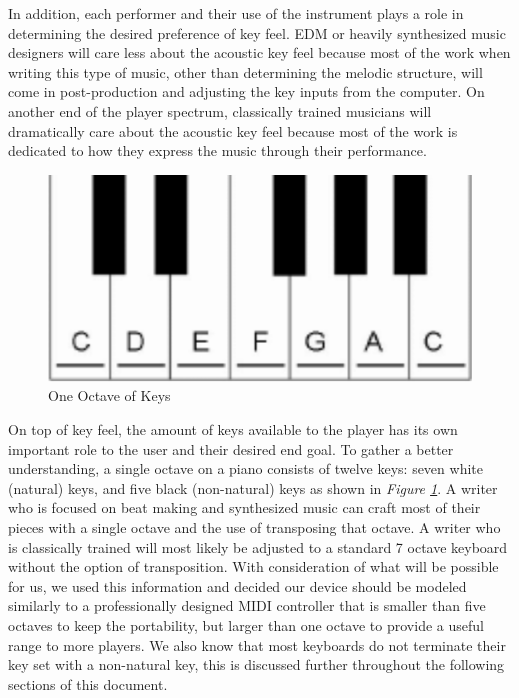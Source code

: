 In addition, each performer and their use of the instrument plays a role in determining the desired preference of key feel. EDM or heavily synthesized music designers will care less about the acoustic key feel because most of the work when writing this type of music, other than determining the melodic structure, will come in post-production and adjusting the key inputs from the computer. On another end of the player spectrum, classically trained musicians will dramatically care about the acoustic key feel because most of the work is dedicated to how they express the music through their performance.

\begin{figure}[h!]
  \centering
  \includegraphics[width=0.5\linewidth]{image/Octave.png}
  \caption{One Octave of Keys}
  \label{fig:octave}
\end{figure}

On top of key feel, the amount of keys available to the player has its own important role to the user and their desired end goal. To gather a better understanding, a single octave on a piano consists of twelve keys: seven white (natural) keys, and five black (non-natural) keys as shown in \textit{Figure \ref{fig:octave}}. A writer who is focused on beat making and synthesized music can craft most of their pieces with a single octave and the use of transposing that octave. A writer who is classically trained will most likely be adjusted to a standard 7 octave keyboard without the option of transposition. With consideration of what will be possible for us, we used this information and decided our device should be modeled similarly to a professionally designed MIDI controller that is smaller than five octaves to keep the portability, but larger than one octave to provide a useful range to more players. We also know that most keyboards do not terminate their key set with a non-natural key, this is discussed further throughout the following sections of this document.

